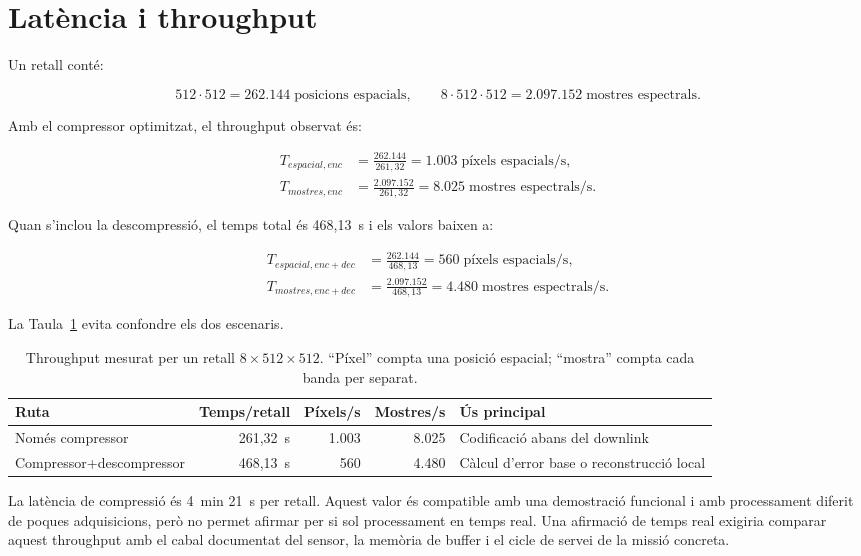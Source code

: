 \section{Latència i throughput}\label{sec:throughput}

Un retall conté:

\begin{equation}
512\cdot512=262.144\;\text{posicions espacials},
\qquad
8\cdot512\cdot512=2.097.152\;\text{mostres espectrals}.
\end{equation}

Amb el compressor optimitzat, el throughput observat és:

\begin{align}
T_{espacial,enc} &= \frac{262.144}{261,32}
                   = 1.003\;\text{píxels espacials/s},\\
T_{mostres,enc} &= \frac{2.097.152}{261,32}
                   = 8.025\;\text{mostres espectrals/s}.
\end{align}

Quan s'inclou la descompressió, el temps total és 468,13~s i els valors baixen
a:

\begin{align}
T_{espacial,enc+dec} &= \frac{262.144}{468,13}
                   = 560\;\text{píxels espacials/s},\\
T_{mostres,enc+dec} &= \frac{2.097.152}{468,13}
                   = 4.480\;\text{mostres espectrals/s}.
\end{align}

La Taula~\ref{tab:throughput} evita confondre els dos escenaris.

\begin{table}[H]
\centering
\small
\begin{tabularx}{\textwidth}{lrrr>{\raggedright\arraybackslash}X}
\toprule
Ruta & Temps/retall & Píxels/s & Mostres/s & Ús principal \\
\midrule
Només compressor & 261,32~s & 1.003 & 8.025 & Codificació abans del downlink \\
Compressor+descompressor & 468,13~s & 560 & 4.480 & Càlcul d'error base o reconstrucció local \\
\bottomrule
\end{tabularx}
\caption{Throughput mesurat per un retall $8\times512\times512$. ``Píxel''
compta una posició espacial; ``mostra'' compta cada banda per separat.}
\label{tab:throughput}
\end{table}

La latència de compressió és 4~min 21~s per retall. Aquest valor és compatible
amb una demostració funcional i amb processament diferit de poques adquisicions,
però no permet afirmar per si sol processament en temps real. Una afirmació de
temps real exigiria comparar aquest throughput amb el cabal documentat del
sensor, la memòria de buffer i el cicle de servei de la missió concreta.

